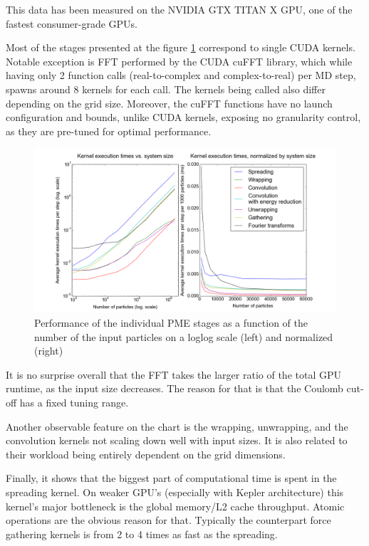 \documentclass[12pt,a4paper]{report}
\begin{document}
This data has been measured on the NVIDIA GTX TITAN X GPU, one of the fastest consumer-grade GPUs.

Most of the stages presented at the figure \ref{fig:kernels} correspond to single CUDA kernels. Notable exception is FFT performed by the CUDA cuFFT library, which while having only 2 function calls (real-to-complex and complex-to-real) per MD step, spawns around 8 kernels for each call. The kernels being called also differ depending on the grid size. Moreover, the cuFFT functions have no launch configuration and bounds, unlike CUDA kernels, exposing no granularity control, as they are pre-tuned for optimal performance. 

\begin{figure} [h!]
    \centering
    \includegraphics[width=1\textwidth]{pics/kernels-noconcur.png}
    \caption{Performance of the individual PME stages as a function of the number of the input particles on a loglog scale (left) and normalized (right)}
    \label{fig:kernels}
\end{figure}


It is no surprise overall that the FFT takes the larger ratio of the total GPU runtime, as the input size decreases. The reason for that is that the Coulomb cut-off has a fixed tuning range.

Another observable feature on the chart is the wrapping, unwrapping, and the convolution kernels not scaling down well with input sizes. It is also related to their workload being entirely dependent on the grid dimensions.

Finally, it shows that the biggest part of computational time is spent in the spreading kernel. On weaker GPU's (especially with Kepler architecture) this kernel's major bottleneck is the global memory/L2 cache throughput. Atomic operations are the obvious reason for that. Typically the counterpart force gathering kernels is from 2 to 4 times as fast as the spreading. 
\end{document}
